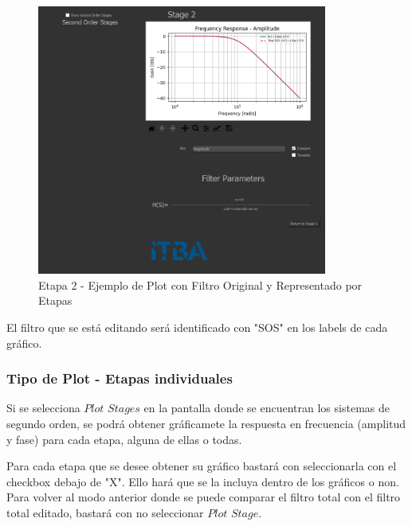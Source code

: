 \begin{figure}[H]
    \centering
    \includegraphics[width=0.85\textwidth]{../Ejercicio1-FilterTool/Imagenes/comparacion.png}
    \caption{Etapa 2 - Ejemplo de Plot con Filtro Original y Representado por Etapas}
\end{figure}

El filtro que se está editando será identificado con "SOS" en los labels de cada gráfico.

\subsubsection{Tipo de Plot - Etapas individuales}

Si se selecciona $Plot$ $Stages$ en la pantalla donde se encuentran los sistemas de segundo orden, se podrá obtener gráficamete la respuesta en frecuencia (amplitud y fase) para cada etapa, alguna de ellas o todas.

Para cada etapa que se desee obtener su gráfico bastará con seleccionarla con el checkbox debajo de "X". Ello hará que se la incluya dentro de los gráficos o non. Para volver al modo anterior donde se puede comparar el filtro total con el filtro total editado,
bastará con no seleccionar $Plot$ $Stage$.

